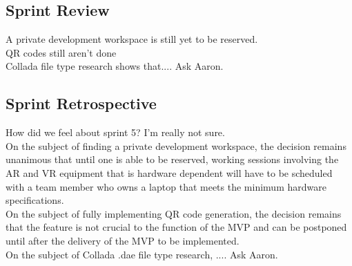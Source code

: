     \subsection{Sprint Review}
    \label{sec:Sprint5_review}
        \hspace{7mm}
        A private development workspace is still yet to be reserved.\\

        QR codes still aren't done\\
        
        Collada file type research shows that.... Ask Aaron.

    \subsection{Sprint Retrospective}
    \label{sec:Sprint5_retrospective}
        \hspace{7mm}
        How did we feel about sprint 5? I'm really not sure.\\
        
        On the subject of finding a private development workspace, the decision remains unanimous that until one 
        is able to be reserved, working sessions involving the AR and VR equipment that is hardware dependent 
        will have to be scheduled with a team member who owns a laptop that meets the minimum hardware
        specifications.\\

        On the subject of fully implementing QR code generation, the decision remains that 
        the feature is not crucial to the function of the MVP and can be postponed until after the delivery
        of the MVP to be implemented.\\

        On the subject of Collada .dae file type research, .... Ask Aaron.